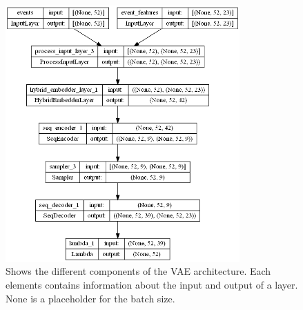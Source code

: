 \documentclass[./../../paper.tex]{subfiles}
\begin{document}
\begin{figure}[htbp]
    \centering
    \includegraphics[width=0.8\textwidth]{figures/generator50lstm.png}
    \caption{Shows the different components of the VAE architecture. Each elements contains information about the input and output of a layer. None is a placeholder for the batch size.}
    \label{fig:vae_architecture}
\end{figure}
\end{document}
